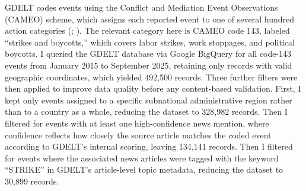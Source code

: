 \documentclass[
  11pt,
]{article}
\begin{document}
GDELT codes events using the Conflict and Mediation Event Observations
(CAMEO) scheme, which assigns each reported event to one of several
hundred action categories (; ). The relevant
category here is CAMEO code 143, labeled ``strikes and boycotts,'' which
covers labor strikes, work stoppages, and political boycotts. I queried
the GDELT database via Google BigQuery for all code-143 events from
January 2015 to September 2025, retaining only records with valid
geographic coordinates, which yielded 492,500 records. Three further
filters were then applied to improve data quality before any
content-based validation. First, I kept only events assigned to a
specific subnational administrative region rather than to a country as a
whole, reducing the dataset to 328,982 records. Then I filtered for
events with at least one high-confidence news mention, where confidence
reflects how closely the source article matches the coded event
according to GDELT's internal scoring, leaving 134,141 records. Then I
filtered for events where the associated news articles were tagged with
the keyword ``STRIKE'' in GDELT's article-level topic metadata, reducing
the dataset to 30,899 records.

\begin{table}

\caption{\label{tbl-pipeline}Data extraction and filtering pipeline.}


\end{table}%
\end{document}
